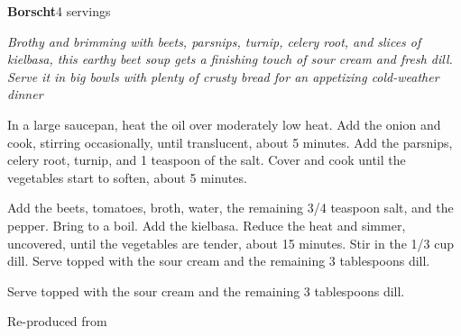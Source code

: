 \documentclass[../recipe-collections/cooking.tex]{subfiles}
\begin{document}
\begin{recipe}{\textbf{Borscht}}{4 servings}{}

  \freeform{}\textit{Brothy and brimming with beets, parsnips, turnip, 
  celery root, and slices of kielbasa, this earthy beet soup gets a 
  finishing touch of sour cream and fresh dill. Serve it in big bowls 
  with plenty of crusty bread for an appetizing cold-weather dinner}


  In a large saucepan, heat the oil over moderately low heat. Add the onion 
  and cook, stirring occasionally, until translucent, about 5 minutes. 
  Add the parsnips, celery root, turnip, and 1 teaspoon of the salt. 
  Cover and cook until the vegetables start to soften, about 5 minutes.


  Add the beets, tomatoes, broth, water, the remaining 3/4 teaspoon salt, 
  and the pepper. Bring to a boil. Add the kielbasa. Reduce the heat and 
  simmer, uncovered, until the vegetables are tender, about 15 minutes. 
  Stir in the 1/3 cup dill. Serve topped with the sour cream and the 
  remaining 3 tablespoons dill.


  Serve topped with the sour cream and the remaining 3 tablespoons dill.


  \freeform{}\hrulefill{}

\end{recipe}

Re-produced from  
\autocite{FoodAndWine_ChunkyBorscht_2019}
\end{document}
